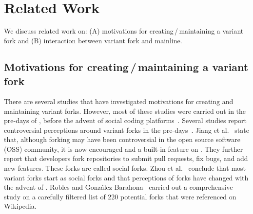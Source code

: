 
\section{Related Work}
\label{sec:background}
We discuss related work on: (A) motivations for creating\,/\,maintaining a variant fork and (B) interaction between variant fork and mainline.%



\subsection{Motivations for creating\,/\,maintaining a variant fork}
\label{sec:motivations}

There are several studies that have investigated motivations for creating and maintaining variant forks. However, most of these studies were carried out in the pre-\gh days of \sourceforge, before the advent of social coding platforms~\cite{Linus:2012Perspectives,Gregorio:2012,Viseur:2012Forks,Linus:2013CodeForking,Laurent:2008,Linus:2011ToFork}. Several studies report controversial perceptions around variant forks in the pre-\gh days~\cite{Chua:Forking:2017,Dixion:2009Forks,Ernst:2010,Linus:2011ToFork,Linus:2014Hackers,Raymond:Cathedral:2001,pete}.
Jiang et al.~\cite{Lo:2017} state that, although forking may have been controversial in the open source software (OSS) community, it is now encouraged and a built-in feature on \gh. They further report that developers fork repositories to submit pull requests, fix bugs, and add new features. These forks are called social forks.
Zhou et al.~\cite{Zhou:2020} conclude that most variant forks start as social forks
and that perceptions of forks have changed with the advent of \gh.
Robles and Gonz{\'a}lez-Barahona~\cite{Gregorio:2012} carried out a comprehensive study on a carefully filtered list of 220 potential forks that were referenced on Wikipedia. %

